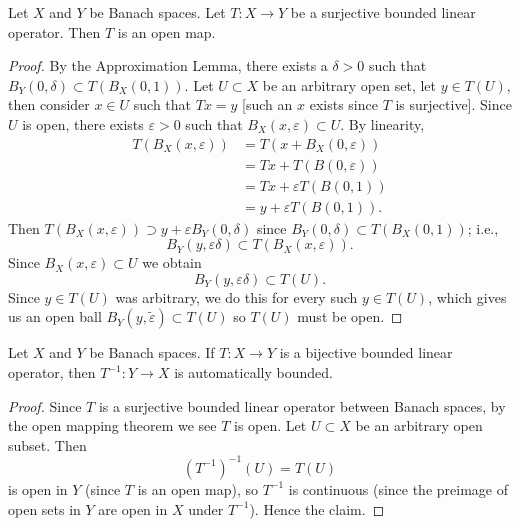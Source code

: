\begin{theorem}
Let $X$ and $Y$ be Banach spaces. Let $T\colon X\to Y$ be a surjective bounded
linear operator. Then $T$ is an open map.
\end{theorem}

\begin{proof}
By the Approximation Lemma, there exists a $\delta>0$ such that
$B_{Y}(0,\delta)\subset T(B_{X}(0,1))$. Let $U\subset X$ be an
arbitrary open set, let $y\in T(U)$, then consider $x\in U$ such that $Tx=y$
[such an $x$ exists since $T$ is surjective]. Since $U$ is open, there
exists $\varepsilon>0$ such that $B_{X}(x,\varepsilon)\subset U$. By linearity,
\begin{subequations}
  \begin{align}
T(B_{X}(x,\varepsilon))
&=T(x+B_{X}(0,\varepsilon))\\
&=Tx + T(B(0,\varepsilon))\\
&=Tx + \varepsilon T(B(0,1))\\
&=y + \varepsilon T(B(0,1)).
  \end{align}
\end{subequations}
Then $T(B_{X}(x,\varepsilon))\supset y+\varepsilon B_{Y}(0,\delta)$
since $B_{Y}(0,\delta)\subset T(B_{X}(0,1))$; i.e.,
\begin{equation}
B_{Y}(y,\varepsilon\delta)\subset T(B_{X}(x,\varepsilon)).
\end{equation}
Since $B_{X}(x,\varepsilon)\subset U$ we obtain
\begin{equation}
B_{Y}(y,\varepsilon\delta)\subset T(U).
\end{equation}
Since $y\in T(U)$ was arbitrary, we do this for every such $y\in T(U)$,
which gives us an open ball $B_{Y}(y,\widetilde{\varepsilon})\subset T(U)$
so $T(U)$ must be open.
\end{proof}

\begin{theorem}
Let $X$ and $Y$ be Banach spaces. If $T\colon X\to Y$ is a bijective
bounded linear operator, then $T^{-1}\colon Y\to X$ is automatically bounded.
\end{theorem}

\begin{proof}
Since $T$ is a surjective bounded linear operator between Banach
spaces, by the open mapping theorem we see $T$ is open. Let $U\subset X$
be an arbitrary open subset. Then
\begin{equation}
(T^{-1})^{-1}(U)=T(U)
\end{equation}
is open in $Y$ (since $T$ is an open map), so $T^{-1}$ is continuous
(since the preimage of open sets in $Y$ are open in $X$ under
$T^{-1}$). Hence the claim.
\end{proof}

